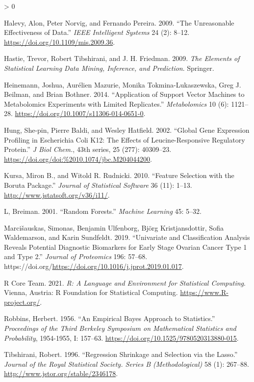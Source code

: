 \documentclass[
]{article}
\newlength{\cslhangindent}
\newenvironment{CSLReferences}[2] %
 {%
  \setlength{\parindent}{0pt}
  \ifodd #1 \everypar{\setlength{\hangindent}{\cslhangindent}}\ignorespaces\fi
  \ifnum #2 > 0
  \setlength{\parskip}{#2\baselineskip}
  \fi
 }%
 {}
\begin{document}
\begin{CSLReferences}{1}{0}
\leavevmode\hypertarget{ref-unreasonable_effectiveness}{}%
Halevy, Alon, Peter Norvig, and Fernando Pereira. 2009. {``The Unreasonable Effectiveness of Data.''} \emph{IEEE Intelligent Systems} 24 (2): 8--12. \url{https://doi.org/10.1109/mis.2009.36}.

\leavevmode\hypertarget{ref-ESL}{}%
Hastie, Trevor, Robert Tibshirani, and J. H. Friedman. 2009. \emph{The Elements of Statistical Learning Data Mining, Inference, and Prediction}. Springer.

\leavevmode\hypertarget{ref-SVM_onepercent}{}%
Heinemann, Joshua, Aurélien Mazurie, Monika Tokmina-Lukaszewska, Greg J. Beilman, and Brian Bothner. 2014. {``Application of Support Vector Machines to Metabolomics Experiments with Limited Replicates.''} \emph{Metabolomics} 10 (6): 1121--28. \url{https://doi.org/10.1007/s11306-014-0651-0}.

\leavevmode\hypertarget{ref-dataset}{}%
Hung, She-pin, Pierre Baldi, and Wesley Hatfield. 2002. {``Global Gene Expression Profiling in Escherichia Coli K12: The Effects of Leucine-Responsive Regulatory Protein.''} \emph{J Biol Chem.}, 43th series, 25 (277): 40309--23. \url{https://doi.org/doi:\%2010.1074/jbc.M204044200}.

\leavevmode\hypertarget{ref-Boruta}{}%
Kursa, Miron B., and Witold R. Rudnicki. 2010. {``Feature Selection with the {Boruta} Package.''} \emph{Journal of Statistical Software} 36 (11): 1--13. \url{http://www.jstatsoft.org/v36/i11/}.

\leavevmode\hypertarget{ref-RF}{}%
L, Breiman. 2001. {``Random Forests.''} \emph{Machine Learning} 45: 5--32.

\leavevmode\hypertarget{ref-fdr_example_1}{}%
Marcišauskas, Simonas, Benjamin Ulfenborg, Björg Kristjansdottir, Sofia Waldemarson, and Karin Sundfeldt. 2019. {``Univariate and Classification Analysis Reveals Potential Diagnostic Biomarkers for Early Stage Ovarian Cancer Type 1 and Type 2.''} \emph{Journal of Proteomics} 196: 57--68. https://doi.org/\url{https://doi.org/10.1016/j.jprot.2019.01.017}.

\leavevmode\hypertarget{ref-Rbase}{}%
R Core Team. 2021. \emph{R: A Language and Environment for Statistical Computing}. Vienna, Austria: R Foundation for Statistical Computing. \url{https://www.R-project.org/}.

\leavevmode\hypertarget{ref-robbins1956}{}%
Robbins, Herbert. 1956. {``An Empirical Bayes Approach to Statistics.''} \emph{Proceedings of the Third Berkeley Symposium on Mathematical Statistics and Probability}, 1954-1955, I: 157--63. \url{https://doi.org/10.1525/9780520313880-015}.

\leavevmode\hypertarget{ref-LASSO}{}%
Tibshirani, Robert. 1996. {``Regression Shrinkage and Selection via the Lasso.''} \emph{Journal of the Royal Statistical Society. Series B (Methodological)} 58 (1): 267--88. \url{http://www.jstor.org/stable/2346178}.

\end{CSLReferences}
\end{document}
